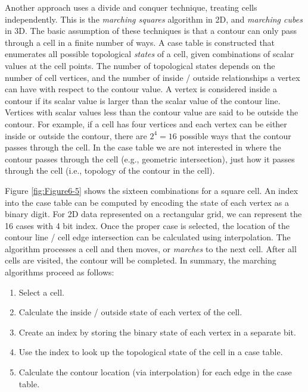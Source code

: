 Another approach uses a divide and conquer technique, treating cells independently. This is the \emph{marching squares} algorithm in 2D, and \emph{marching cubes} \cite{Lorensen87} in 3D. The basic assumption of these techniques is that a contour can only pass through a cell in a finite number of ways. A case table is constructed that enumerates all possible topological \emph{states} of a cell, given combinations of scalar values at the cell points. The number of topological states depends on the number of cell vertices, and the number of inside / outside relationships a vertex can have with respect to the contour value. A vertex is considered inside a contour if its scalar value is larger than the scalar value of the contour line. Vertices with scalar values less than the contour value are said to be outside the contour. For example, if a cell has four vertices and each vertex can be either inside or outside the contour, there are $2^4 = 16$ possible ways that the contour passes through the cell. In the case table we are not interested in where the contour passes through the cell (e.g., geometric intersection), just how it passes through the cell (i.e., topology of the contour in the cell).

Figure \ref{fig:Figure6-5} shows the sixteen combinations for a square cell. An index into the case table can be computed by encoding the state of each vertex as a binary digit. For 2D data represented on a rectangular grid, we can represent the 16 cases with 4 bit index. Once the proper case is selected, the location of the contour line / cell edge intersection can be calculated using interpolation. The algorithm processes a cell and then moves, or \emph{marches} to the next cell. After all cells are visited, the contour will be completed. In summary, the marching algorithms proceed as follows:

\begin {enumerate}

\item Select a cell.

\item Calculate the inside / outside state of each vertex of the cell.

\item Create an index by storing the binary state of each vertex in a separate bit.

\item Use the index to look up the topological state of the cell in a case
table.

\item Calculate the contour location (via interpolation) for each edge in  the case table.

\end{enumerate}

